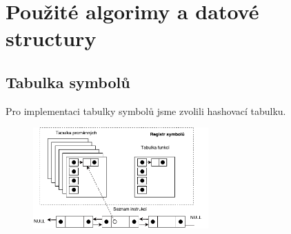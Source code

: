 \section{Použité algorimy a datové structury}
\subsection{Tabulka symbolů}
Pro implementaci tabulky symbolů jsme zvolili hashovací
tabulku.

\begin{figure}[htbp]
    \centering
    \includegraphics[width=0.6\textwidth, angle=0]{src/assets/symbol_table.pdf}
\end{figure}